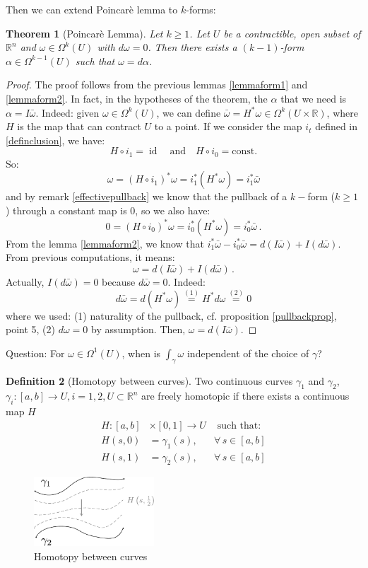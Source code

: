 \documentclass[a4paper,11pt,titlepage, article, oneside]{memoir}
\numberwithin{equation}{section}
\newtheorem{theorem}{Theorem}[section]
\theoremstyle{definition}
\newtheorem{definition}[theorem]{Definition}
\theoremstyle{remark}
\DeclareMathOperator{\id}{id}
\newcommand{\rfield}{\mathbb{R}}
\begin{document}
Then we can extend Poincarè lemma to $k$-forms:
\begin{theorem} [Poincarè Lemma] \label{poinclemma}
  Let $k \ge 1$. Let $U$ be a contractible, open subset of $\rfield^n$ and $\omega \in \Omega^k(U)$ with $d\omega = 0$. Then there exists a $(k-1)$-form $\alpha \in \Omega^{k-1} (U)$ such that $\omega = d\alpha$.
\end{theorem}
\begin{proof}
The proof follows from the previous lemmas  \ref{lemmaform1} and \ref{lemmaform2}. In fact, in the hypotheses of the theorem, the $\alpha$ that we need is $\alpha = I \bar \omega$. Indeed: given $\omega \in \Omega^k(U)$, we can define $\bar \omega = H^* \omega \in \Omega^k(U \times \rfield)$, where $H$ is the map that can contract $U$ to a point. If we consider the map $i_t$ defined in \eqref{definclusion}, we have:
$$H \circ i_1 = \id \quad \text{and} \quad H \circ i_0 = \text{const.}$$
So:
$$\omega = (H \circ i_1)^* \omega = i_1^* (H^* \omega) = i_1^* \bar \omega$$
and by remark \ref{effectivepullback} we know that the pullback of a $k-$form ($k \ge 1$) through a constant map is 0, so we also have:
$$0 = (H \circ i_0)^* \omega = i_0^* (H^* \omega) = i_0^* \bar \omega \, .$$
From the lemma \ref{lemmaform2}, we know that $i_1^* \bar \omega - i_0^* \bar \omega = d(I \bar \omega) + I(d \bar \omega) $. From previous computations, it means:
$$\omega = d(I \bar \omega) + I (d \bar \omega) \, .$$
Actually, $I (d \bar \omega) = 0$ because $d \bar \omega = 0$. Indeed:
$$d \bar \omega = d(H^* \omega) \overset{(1)}{=} H^* d \omega \overset{(2)}{=} 0$$
where we used: (1) naturality of the pullback, cf. proposition \ref{pullbackprop}, point 5, (2) $d \omega = 0$ by assumption.
Then, $\omega = d(I \bar \omega)$.
\end{proof}

Question: For $\omega \in \Omega^1(U)$, when is $\int_{\gamma}\omega$ independent of the choice of $\gamma$?

\begin{definition}[Homotopy between curves]
  Two continuous curves $\gamma_1$ and $\gamma_2$, $\gamma_i \colon [a, b] \rightarrow U, i=1,2, U \subset \rfield^n$ are freely homotopic if there exists a continuous map $H$
  \begin{align*}
    H \colon [a, b] &\times [0, 1] \rightarrow U &\text{ such that:}\\
    H(s, 0) &= \gamma_1(s), &\forall\, s \in [a, b] \\
    H(s, 1) &= \gamma_2(s), &\forall\, s \in [a, b]
  \end{align*}
  \begin{figure}[H] \label{Fig:hom1}
     \centering
     \includegraphics[width=0.4\textwidth]{Images/homotopy1.pdf}
     \caption{Homotopy between curves}
\end{figure}
\end{definition}
\end{document}
